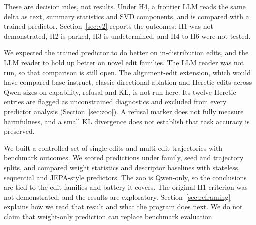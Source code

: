 These are decision rules, not results. Under H4, a frontier LLM reads the same delta as text, summary statistics and SVD components, and is compared with a trained predictor. Section~\ref{sec:v2} reports the outcomes: H1 was not demonstrated, H2 is parked, H3 is undetermined, and H4 to H6 were not tested.

We expected the trained predictor to do better on in-distribution edits, and the LLM reader to hold up better on novel edit families. The LLM reader was not run, so that comparison is still open. The alignment-edit extension, which would have compared base-instruct, classic directional-ablation and Heretic edits across Qwen sizes on capability, refusal and KL, is not run here. Its twelve Heretic entries are flagged as unconstrained diagnostics and excluded from every predictor analysis (Section~\ref{sec:zoo}). A refusal marker does not fully measure harmfulness, and a small KL divergence does not establish that task accuracy is preserved.

We built a controlled set of single edits and multi-edit trajectories with benchmark outcomes. We scored predictions under family, seed and trajectory splits, and compared weight statistics and descriptor baselines with stateless, sequential and JEPA-style predictors. The zoo is Qwen-only, so the conclusions are tied to the edit families and battery it covers. The original H1 criterion was not demonstrated, and the results are exploratory. Section~\ref{sec:reframing} explains how we read that result and what the program does next. We do not claim that weight-only prediction can replace benchmark evaluation.
